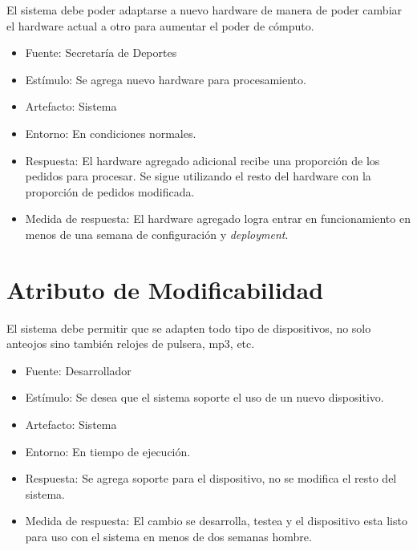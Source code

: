 El sistema debe poder adaptarse a nuevo hardware de manera de poder
cambiar el hardware actual a otro para aumentar el poder de cómputo.

\begin{itemize}
\itemsep1pt\parskip0pt
\item
  Fuente: Secretaría de Deportes
\item
  Estímulo: Se agrega nuevo hardware para procesamiento.
\item
  Artefacto: Sistema
\item
  Entorno: En condiciones normales.
\item
  Respuesta: El hardware agregado adicional recibe una proporción de los
  pedidos para procesar. Se sigue utilizando el resto del hardware con
  la proporción de pedidos modificada.
\item
  Medida de respuesta: El hardware agregado logra entrar en
  funcionamiento en menos de una semana de configuración y
  \emph{deployment}.
\end{itemize}

\section{Atributo de Modificabilidad}

El sistema debe permitir que se adapten todo tipo de dispositivos, no
solo anteojos sino también relojes de pulsera, mp3, etc.

\begin{itemize}
\itemsep1pt\parskip0pt
\item
  Fuente: Desarrollador
\item
  Estímulo: Se desea que el sistema soporte el uso de un nuevo
  dispositivo.
\item
  Artefacto: Sistema
\item
  Entorno: En tiempo de ejecución.
\item
  Respuesta: Se agrega soporte para el dispositivo, no se modifica el
  resto del sistema.
\item
  Medida de respuesta: El cambio se desarrolla, testea y el dispositivo
  esta listo para uso con el sistema en menos de dos semanas hombre.
\end{itemize}

